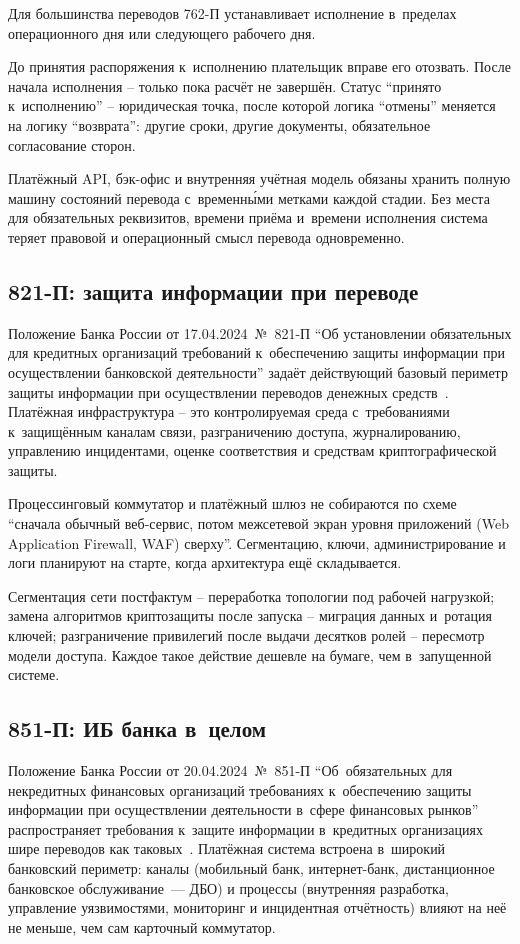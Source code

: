 Для большинства переводов 762-П устанавливает исполнение в~пределах операционного дня или следующего рабочего дня.

До принятия распоряжения к~исполнению плательщик вправе его отозвать. После начала исполнения -- только пока расчёт не завершён.
Статус \enquote{принято к~исполнению} -- юридическая точка, после которой логика \enquote{отмены} меняется на логику \enquote{возврата}: другие сроки, другие документы, обязательное согласование сторон.

Платёжный API, бэк-офис и внутренняя учётная модель обязаны хранить полную машину состояний перевода с~временн\'{ы}ми метками каждой стадии. Без места для обязательных реквизитов, времени приёма и~времени исполнения система теряет правовой и операционный смысл перевода одновременно.

\subsection*{821-П: защита информации при переводе}

Положение Банка России от 17.04.2024~№~821-П \enquote{Об установлении обязательных для кредитных организаций требований к~обеспечению защиты информации при осуществлении банковской деятельности} задаёт действующий базовый периметр защиты информации при осуществлении переводов денежных средств~\cite{cbr-821p}. Платёжная инфраструктура -- это контролируемая среда с~требованиями к~защищённым каналам связи, разграничению доступа, журналированию, управлению инцидентами, оценке соответствия и средствам криптографической защиты.

Процессинговый коммутатор и платёжный шлюз не собираются по схеме \enquote{сначала обычный веб-сервис, потом межсетевой экран уровня приложений (Web Application Firewall, WAF) сверху}. Сегментацию, ключи, администрирование и логи планируют на старте, когда архитектура ещё складывается.

Сегментация сети постфактум -- переработка топологии под рабочей нагрузкой; замена алгоритмов криптозащиты после запуска -- миграция данных и~ротация ключей; разграничение привилегий после выдачи десятков ролей -- пересмотр модели доступа. Каждое такое действие дешевле на бумаге, чем в~запущенной системе.

\subsection*{851-П: ИБ банка в~целом}

Положение Банка России от 20.04.2024~№~851-П \enquote{Об~обязательных для некредитных финансовых организаций требованиях к~обеспечению защиты информации при осуществлении деятельности в~сфере финансовых рынков} распространяет требования к~защите информации в~кредитных организациях шире переводов как таковых~\cite{cbr-851p}. Платёжная система встроена в~широкий банковский периметр: каналы (мобильный банк, интернет-банк, дистанционное банковское обслуживание~--- ДБО) и процессы (внутренняя разработка, управление уязвимостями, мониторинг и инцидентная отчётность) влияют на неё не меньше, чем сам карточный коммутатор.

